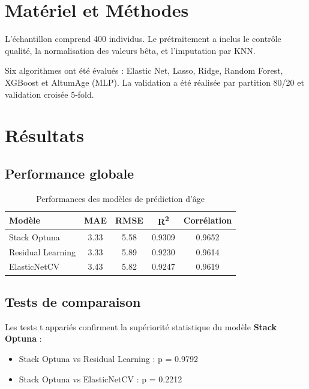 \documentclass[11pt,a4paper]{article}
\begin{document}
\section{Matériel et Méthodes}
L'échantillon comprend 400 individus. Le prétraitement a inclus le contrôle qualité, la normalisation des valeurs bêta, et l'imputation par KNN.

Six algorithmes ont été évalués : Elastic Net, Lasso, Ridge, Random Forest, XGBoost et AltumAge (MLP). La validation a été réalisée par partition 80/20 et validation croisée 5-fold.

\section{Résultats}
\subsection{Performance globale}

\begin{table}[H]
\centering
\begin{tabular}{lcccc}
\toprule
\textbf{Modèle} & \textbf{MAE} & \textbf{RMSE} & \textbf{R\textsuperscript{2}} & \textbf{Corrélation} \\
\midrule
Stack Optuna & 3.33 & 5.58 & 0.9309 & 0.9652 \\
Residual Learning & 3.33 & 5.89 & 0.9230 & 0.9614 \\
ElasticNetCV & 3.43 & 5.82 & 0.9247 & 0.9619 \\
\bottomrule
\end{tabular}
\caption{Performances des modèles de prédiction d'âge}
\end{table}

\subsection{Tests de comparaison}
Les tests t appariés confirment la supériorité statistique du modèle \textbf{Stack Optuna} :
\begin{itemize}
\item Stack Optuna vs Residual Learning : p = 0.9792
\item Stack Optuna vs ElasticNetCV : p = 0.2212
\end{itemize}
\end{document}
